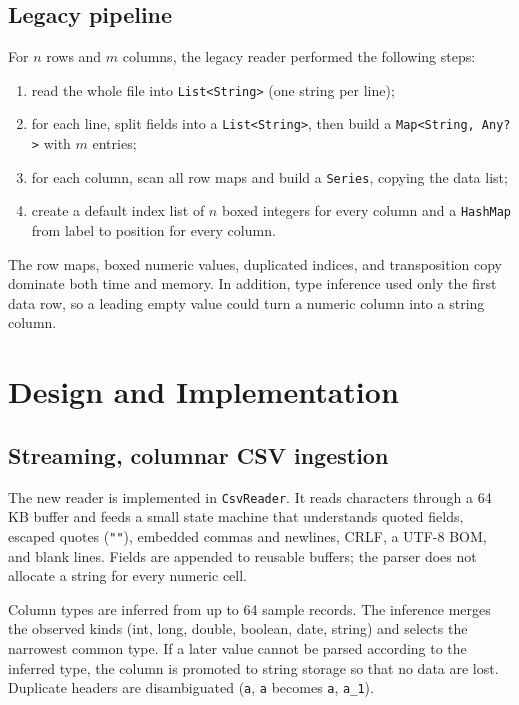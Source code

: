 \documentclass[11pt,a4paper]{article}
\newcommand{\code}[1]{\texttt{#1}}
\begin{document}
\subsection{Legacy pipeline}

For $n$ rows and $m$ columns, the legacy reader performed the following steps:
\begin{enumerate}
  \item read the whole file into \code{List<String>} (one string per line);
  \item for each line, split fields into a \code{List<String>}, then build a
        \code{Map<String, Any?>} with $m$ entries;
  \item for each column, scan all row maps and build a \code{Series}, copying the data list;
  \item create a default index list of $n$ boxed integers for every column and a
        \code{HashMap} from label to position for every column.
\end{enumerate}
The row maps, boxed numeric values, duplicated indices, and transposition copy dominate both
time and memory.  In addition, type inference used only the first data row, so a leading empty
value could turn a numeric column into a string column.

\section{Design and Implementation}

\subsection{Streaming, columnar CSV ingestion}

The new reader is implemented in \code{CsvReader}.  It reads characters through a 64\,KB buffer
and feeds a small state machine that understands quoted fields, escaped quotes (\code{""}),
embedded commas and newlines, CRLF, a UTF-8 BOM, and blank lines.  Fields are appended to reusable
buffers; the parser does not allocate a string for every numeric cell.

Column types are inferred from up to 64 sample records.  The inference merges the observed kinds
(int, long, double, boolean, date, string) and selects the narrowest common type.  If a later value
cannot be parsed according to the inferred type, the column is promoted to string storage so that
no data are lost.  Duplicate headers are disambiguated (\code{a}, \code{a} becomes \code{a},
\code{a\_1}).
\end{document}
